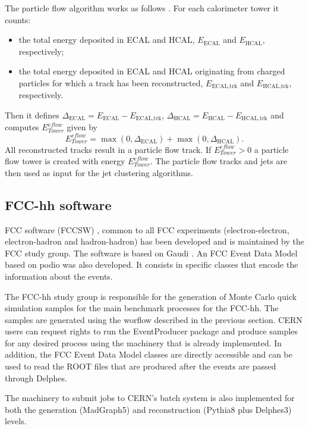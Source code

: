The particle flow algorithm works as follows \cite{Delphes}. For each calorimeter tower it counts:
\begin{itemize}
	\item the total energy deposited in ECAL and HCAL, $E_{\text{ECAL}}$ and $E_{\text{HCAL}}$, respectively;
	\item the total energy deposited in ECAL and HCAL originating from charged particles for which a track has been reconstructed, $E_{\text{ECAL,trk}}$ and $E_{\text{HCAL,trk}}$, respectively.
\end{itemize}
Then it defines $\Delta_{\text{ECAL}}=E_{\text{ECAL}}-E_{\text{ECAL,trk}}$, $\Delta_{\text{HCAL}}=E_{\text{HCAL}}-E_{\text{HCAL,trk}}$ and computes $E^{eflow}_{Tower}$ given by
\begin{equation}
	E^{eflow}_{Tower}=\max(0,\Delta_{\text{ECAL}})+\max(0,\Delta_{\text{HCAL}}).
\end{equation}
All reconstructed tracks result in a particle flow track. If $E^{eflow}_{Tower}>0$ a particle flow tower is created with energy $E^{eflow}_{Tower}$. The particle flow tracks and jets are then used as input for the jet clustering algorithms.

\subsection{FCC-hh software}
\label{subsec:FCC_software}

FCC software (FCCSW) \cite{FCCSW}, common to all FCC experiments (electron-electron, electron-hadron and hadron-hadron) has been developed and is maintained by the FCC study group. The software is based on Gaudi \cite{gaudi}. An FCC Event Data Model based on podio \cite{Podio} was also developed. It consists in specific classes that encode the information about the events.

The FCC-hh study group is responsible for the generation of Monte Carlo quick simulation samples for the main benchmark processes for the FCC-hh. The samples are generated using the worflow described in the previous section. CERN users can request rights to run the EventProducer package \cite{FCCEventProducer} and produce samples for any desired process using the machinery that is already implemented. In addition, the FCC Event Data Model classes are directly accessible and can be used to read the ROOT files that are produced after the events are passed through Delphes.

The machinery to submit jobs to CERN's batch system is also implemented for both the generation (MadGraph5) and reconstruction (Pythia8 plus Delphes3) levels.

